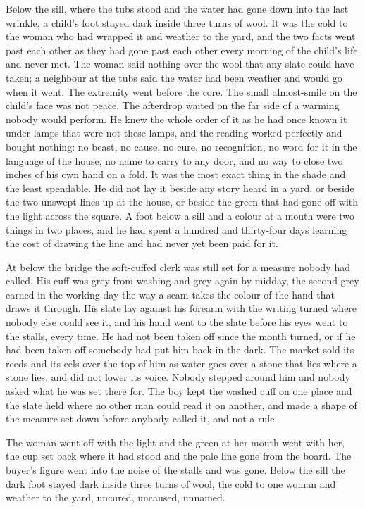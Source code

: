 Below the sill, where the tubs stood and the water had gone down into the last wrinkle, a child's foot stayed dark inside three turns of wool. It was the cold to the woman who had wrapped it and weather to the yard, and the two facts went past each other as they had gone past each other every morning of the child's life and never met. The woman said nothing over the wool that any slate could have taken; a neighbour at the tubs said the water had been weather and would go when it went. The extremity went before the core. The small almost-smile on the child's face was not peace. The afterdrop waited on the far side of a warming nobody would perform. He knew the whole order of it as he had once known it under lamps that were not these lamps, and the reading worked perfectly and bought nothing: no beast, no cause, no cure, no recognition, no word for it in the language of the house, no name to carry to any door, and no way to close two inches of his own hand on a fold. It was the most exact thing in the shade and the least spendable. He did not lay it beside any story heard in a yard, or beside the two unswept lines up at the house, or beside the green that had gone off with the light across the square. A foot below a sill and a colour at a mouth were two things in two places, and he had spent a hundred and thirty-four days learning the cost of drawing the line and had never yet been paid for it.

At  below the bridge the soft-cuffed clerk was still set for a measure nobody had called. His cuff was grey from washing and grey again by midday, the second grey earned in the working day the way a seam takes the colour of the hand that draws it through. His slate lay against his forearm with the writing turned where nobody else could see it, and his hand went to the slate before his eyes went to the stalls, every time. He had not been taken off since the month turned, or if he had been taken off somebody had put him back in the dark. The market sold its reeds and its eels over the top of him as water goes over a stone that lies where a stone lies, and did not lower its voice. Nobody stepped around him and nobody asked what he was set there for. The boy kept the washed cuff on one place and the slate held where no other man could read it on another, and made a shape of the measure set down before anybody called it, and not a rule.

The woman went off with the light and the green at her mouth went with her, the cup set back where it had stood and the pale line gone from the board. The buyer's figure went into the noise of the stalls and was gone. Below the sill the dark foot stayed dark inside three turns of wool, the cold to one woman and weather to the yard, uncured, uncaused, unnamed.
